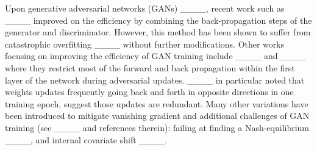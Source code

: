 Upon generative adversarial networks (GANs) ____, recent work such as ____ improved on the efficiency by combining the back-propagation steps of the generator and discriminator. However, this method has been shown to suffer from catastrophic overfitting ____ without further modifications. Other works focusing on improving the efficiency of GAN training include ____ and ____ where they restrict most of the forward and back propagation within the first layer of the network during adversarial updates. ____ in particular noted that weights updates frequently going back and forth in opposite directions in one training epoch, suggest those updates are redundant.
Many other variations have been introduced to mitigate vanishing gradient and additional challenges of GAN training (see ____ and references therein): failing at finding a Nash-equilibrium ____, and internal
covariate shift ____.


